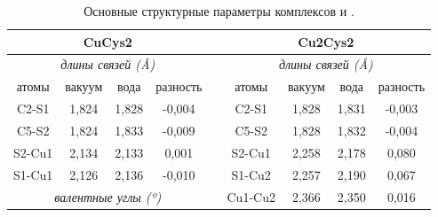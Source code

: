 \documentclass[a4paper,12pt]{article}
\begin{document}
\begin{onehalfspace}
	\begin{table}[H]
		\caption{Основные структурные параметры комплексов  и .}
		\label{tab4}
		\centering
		\begin{tabular}{ccccc|cccc|}
			\hline
			\multicolumn{4}{|c|}{\textbf{CuCys2}}                                                                                         & \textbf{} & \multicolumn{4}{c|}{\textbf{Cu2Cys2}}                                                                     \\ \hline
			\multicolumn{4}{|c|}{\textit{длины связей (Å)}}                                                                               & \textit{} & \multicolumn{4}{c|}{\textit{длины связей (Å)}}                                                            \\ \hline
			\multicolumn{1}{|c|}{атомы}        & \multicolumn{1}{c|}{вакуум} & \multicolumn{1}{c|}{вода}  & \multicolumn{1}{c|}{разность} &           & \multicolumn{1}{c|}{атомы}         & \multicolumn{1}{c|}{вакуум} & \multicolumn{1}{c|}{вода}   & разность \\ \hline
			\multicolumn{1}{|c|}{C2-S1}        & \multicolumn{1}{c|}{1,824}  & \multicolumn{1}{c|}{1,828} & \multicolumn{1}{c|}{-0,004}   &           & \multicolumn{1}{c|}{C2-S1}         & \multicolumn{1}{c|}{1,828}  & \multicolumn{1}{c|}{1,831}  & -0,003   \\ \cline{1-4} \cline{6-9} 
			\multicolumn{1}{|c|}{C5-S2}        & \multicolumn{1}{c|}{1,824}  & \multicolumn{1}{c|}{1,833} & \multicolumn{1}{c|}{-0,009}   &           & \multicolumn{1}{c|}{C5-S2}         & \multicolumn{1}{c|}{1,828}  & \multicolumn{1}{c|}{1,832}  & -0,004   \\ \cline{1-4} \cline{6-9} 
			\multicolumn{1}{|c|}{S2-Cu1}       & \multicolumn{1}{c|}{2,134}  & \multicolumn{1}{c|}{2,133} & \multicolumn{1}{c|}{0,001}    &           & \multicolumn{1}{c|}{S2-Cu1}        & \multicolumn{1}{c|}{2,258}  & \multicolumn{1}{c|}{2,178}  & 0,080    \\ \cline{1-4} \cline{6-9} 
			\multicolumn{1}{|c|}{S1-Cu1}       & \multicolumn{1}{c|}{2,126}  & \multicolumn{1}{c|}{2,136} & \multicolumn{1}{c|}{-0,010}   &           & \multicolumn{1}{c|}{S1-Cu2}        & \multicolumn{1}{c|}{2,257}  & \multicolumn{1}{c|}{2,190}  & 0,067    \\ \cline{1-4} \cline{6-9} 
			\multicolumn{4}{|c|}{\textit{валентные углы (º)}}                                                                             & \textit{} & \multicolumn{1}{c|}{Cu1-Cu2}       & \multicolumn{1}{c|}{2,366}  & \multicolumn{1}{c|}{2,350}  & 0,016    \\ \cline{1-4} \cline{6-9} 

\end{tabular}
\end{table}
\end{onehalfspace}
\end{document}
